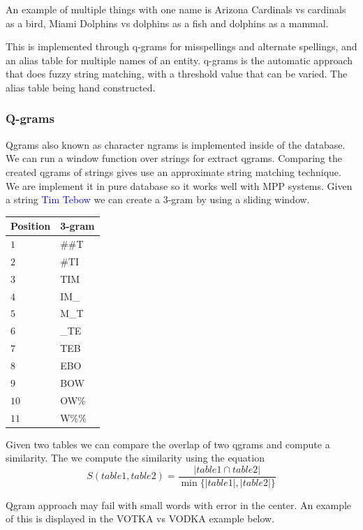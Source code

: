 \documentclass[11pt]{article}
\begin{document}
    An example of multiple things with one name is
    Arizona Cardinals vs cardinals as a bird,
    Miami Dolphins vs dolphins as a fish and dolphins as a mammal.


    This is implemented through q-grams for misspellings and alternate spellings,
    and an alias table for multiple names of an entity.
    q-grams is the automatic approach that does fuzzy string matching,
    with a threshold value that can be varied.
    The alias table being hand constructed.


    \subsubsection{Q-grams}
    \label{qgram}

		Qgrams also known as character ngrams is implemented inside of the database.
		We can run a window function over strings for extract qgrams.
		Comparing the created qgrams of strings gives use an approximate string
		matching technique.
		We are implement it in pure database so it works well with MPP systems.
		Given a string \textcolor{blue}{Tim Tebow} we can create a 3-gram by 
		using a sliding window.
		
		\begin{tabular}{|l|l|}
		\hline
		\textbf{Position} & \textbf{3-gram} \\
		\hline
		$1$ & \#\#T \\
		\hline
		$2$ & \#TI \\
		\hline
		$3$ & TIM \\
		\hline
		$4$ & IM\_ \\
		\hline
		$5$ & M\_T \\
		\hline
		$6$ & \_TE \\
		\hline
		$7$ & TEB \\
		\hline
		$8$ & EBO \\
		\hline
		$9$ & BOW \\
		\hline
		$10$ & OW\% \\
		\hline
		$11$ & W\%\% \\
		\hline
		\end{tabular}

Given two tables we can compare the overlap of two qgrams and compute a
similarity. The we compute the similarity using the equation
$$ S(table1,table2) = \frac{|table1 \cap table2|}{\min\{|table1|, |table2|\}}$$

Qgram approach may fail with small words with error in the center. An 
example of this is displayed in the VOTKA vs VODKA example below.
\end{document}
